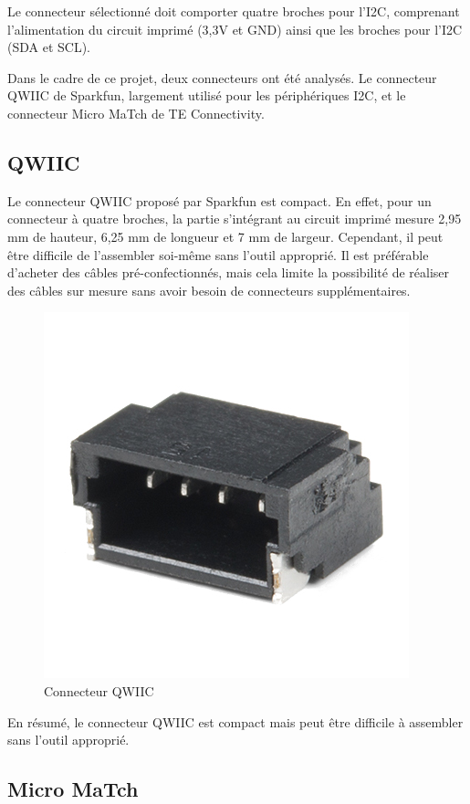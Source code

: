 Le connecteur sélectionné doit comporter quatre broches pour l'I2C, comprenant l'alimentation du circuit imprimé (3,3V et GND) ainsi que les broches pour l'I2C (SDA et SCL).

Dans le cadre de ce projet, deux connecteurs ont été analysés.
Le connecteur QWIIC de Sparkfun, largement utilisé pour les périphériques I2C, et le connecteur Micro MaTch de TE Connectivity.

\subsection{QWIIC}

Le connecteur QWIIC proposé par Sparkfun est compact.
En effet, pour un connecteur à quatre broches, la partie s'intégrant au circuit imprimé mesure 2,95 mm de hauteur, 6,25 mm de longueur et 7 mm de largeur.
Cependant, il peut être difficile de l'assembler soi-même sans l'outil approprié.
Il est préférable d'acheter des câbles pré-confectionnés, mais cela limite la possibilité de réaliser des câbles sur mesure sans avoir besoin de connecteurs supplémentaires.

\begin{figure}[H]
    \centering
    \includegraphics[scale=0.6]{./assets/figures/qwiic.jpg}
    \caption{\cite{qwiic} Connecteur QWIIC}
\end{figure}

En résumé, le connecteur QWIIC est compact mais peut être difficile à assembler sans l'outil approprié.

\subsection{Micro MaTch}

